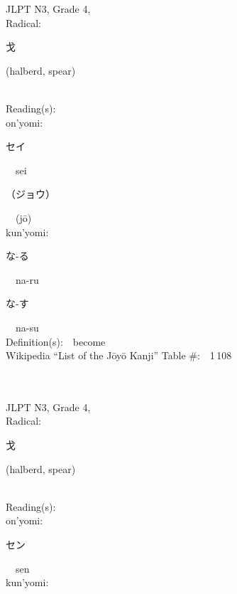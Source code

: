 \begin{multicols}{2}
{JLPT N3, Grade 4, \\Radical:\ \ {\begin{CJK}{UTF8}{min} 戈 \end{CJK}} (halberd, spear) } \\
Reading(s):\ \ \\
{\hspace*{1em}}on'yomi:\ \ \\
{\hspace*{2em}}{\begin{CJK}{UTF8}{min} セイ \end{CJK}}\ \ sei\ \ \\
{\hspace*{2em}}{\begin{CJK}{UTF8}{min} （ジョウ） \end{CJK}}\ \ (j\=o)\ \ \\
{\hspace*{1em}}kun'yomi:\ \ \\
{\hspace*{2em}}{\begin{CJK}{UTF8}{min} な-る \end{CJK}}\ \ na-ru\ \ \\
{\hspace*{2em}}{\begin{CJK}{UTF8}{min} な-す \end{CJK}}\ \ na-su\ \ \\
Definition(s):\ \ become \\
Wikipedia ``List of the J\=oy\=o Kanji'' Table \#:\ \ 1\,108 \\
\ \ \\
{\fontsize{34pt}{40pt}  }\ \ \\  %
{JLPT N3, Grade 4, \\Radical:\ \ {\begin{CJK}{UTF8}{min} 戈 \end{CJK}} (halberd, spear) } \\
Reading(s):\ \ \\
{\hspace*{1em}}on'yomi:\ \ \\
{\hspace*{2em}}{\begin{CJK}{UTF8}{min} セン \end{CJK}}\ \ sen\ \ \\
{\hspace*{1em}}kun'yomi:\ \ \\

\end{multicols}
